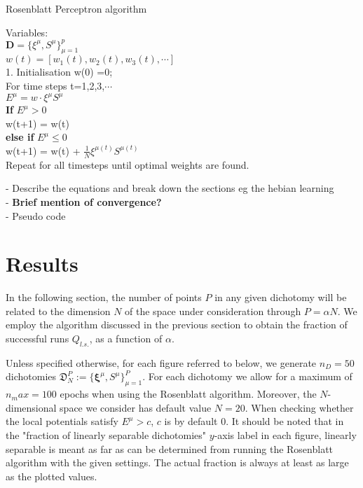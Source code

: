 \documentclass{article}
\def\bxi{\boldsymbol{\xi}}
\begin{document}
\begin{algorithm}[h]
\caption{Rosenblatt Perceptron algorithm}\label{alg:perceptron}
Variables: \\
$\mathbf{D} = \{ \xi^\mu, S^\mu \}^p_{\mu=1} $ \\
$w(t) =[w_1(t),w_2(t),w_3(t), \cdots]$ \\

1. Initialisation w(0) =0;\\
For time steps t=1,2,3,$ \cdots$\\


$ E^\mu = w \cdot \xi^\mu S^\mu  $ \\

\textbf{If} $E^\mu > 0$ \\
\hspace{10mm}   w(t+1) = w(t) \\
\textbf{else if} $ E^\mu \leq 0 $\\
 w(t+1) = w(t) + $ \frac{1}{N}\xi^{\mu(t)} S^{\mu(t)} $\\

Repeat for all timesteps until optimal weights are found.



\end{algorithm}

- Describe the equations and break down the sections  eg the hebian learning \\
- \textbf{Brief mention of convergence?}\\
- Pseudo code



\section{Results}
\def\Qls{Q_{l.s.}}

In the following section, the number of points $P$ in any given dichotomy will be related to the dimension $N$ of the space under consideration through $P = \alpha N$. We employ the algorithm discussed in the previous section to obtain the fraction of successful runs $\Qls$, as a function of $\alpha$.

Unless specified otherwise, for each figure referred to below, we generate $n_D = 50$ dichotomies $\mathfrak{D}_N^P := \{\bxi^\mu, S^\mu\}_{\mu = 1}^P$. For each dichotomy we allow for a maximum of $n_max = 100$ epochs when using the Rosenblatt algorithm. Moreover, the $N$-dimensional space we consider has default value $N = 20$. When checking whether the local potentials satisfy $E^\mu > c$, $c$ is by default 0. It should be noted that in the "fraction of linearly separable dichotomies" $y$-axis label in each figure, linearly separable is meant as far as can be determined from running the Rosenblatt algorithm with the given settings. The actual fraction is always at least as large as the plotted values.
\end{document}
